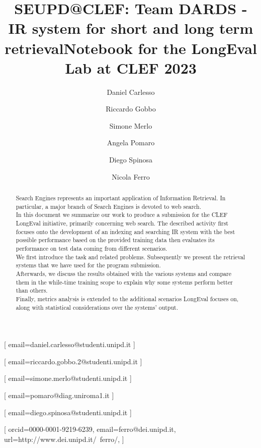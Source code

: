 \documentclass{ceurart}
\begin{document}


\title{SEUPD@CLEF: Team DARDS - IR system for short and long term retrieval}

\title[mode=sub]{Notebook for the LongEval Lab at CLEF 2023}


\author[1]{Daniel Carlesso}[%
email=daniel.carlesso@studenti.unipd.it
]

\author[1]{Riccardo Gobbo}[%
email=riccardo.gobbo.2@studenti.unipd.it
]

\author[1]{Simone Merlo}[%
email=simone.merlo@studenti.unipd.it
]

\author[1,2]{Angela Pomaro}[%
email=pomaro@diag.uniroma1.it
]

\author[1]{Diego Spinosa}[%
email=diego.spinosa@studenti.unipd.it
]

\author[1]{Nicola Ferro}[%
orcid=0000-0001-9219-6239,
email=ferro@dei.unipd.it,
url=http://www.dei.unipd.it/~ferro/,
]

\address[1]{University of Padua, Italy}
\address[2] {University of Rome La Sapienza, Italy}


\begin{abstract}
    Search Engines represents an important application of Information Retrieval. In particular, a major branch of Search Engines is devoted to web search.
    \\
    In this document we summarize our work to produce a submission for the CLEF LongEval initiative, primarily concerning web search. The described activity first focuses onto the development of an indexing and searching IR system with the best possible performance based on the provided training data then evaluates its performance on test data coming from different scenarios.
    \\
    We first introduce the task and related problems. Subsequently we present the retrieval systems that we have used for the program submission.
    \\
    Afterwards, we discuss the results obtained with the various systems and compare them in the while-time training scope to explain why some systems perform better than others.
    \\
    Finally, metrics analysis is extended to the additional scenarios LongEval focuses on, along with statistical considerations over the systems' output.
\end{abstract}
\end{document}
